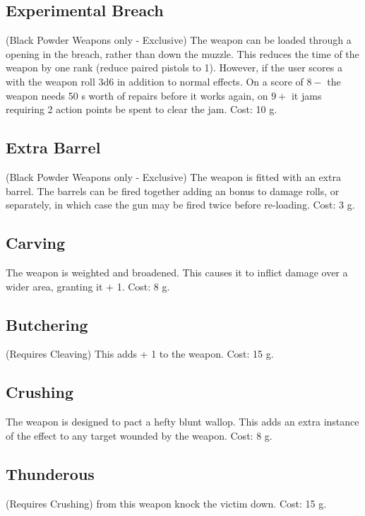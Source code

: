 \subsection{Experimental Breach}
(Black Powder Weapons only - Exclusive) The weapon can be loaded through a opening in the breach, rather than down the muzzle. This reduces the  time of the weapon by one rank (reduce paired pistols to  1). However, if the user scores a  with the weapon roll 3d6 in addition to normal  effects. On a score of $8-$ the weapon needs 50 s worth of repairs before it works again, on $9+$ it jams requiring 2 action points be spent to clear the jam. Cost: 10 g.

\subsection{Extra Barrel}
(Black Powder Weapons only - Exclusive) The weapon is fitted with an extra barrel. The barrels can be fired together adding an  bonus to damage rolls, or separately, in which case the gun may be fired twice before re-loading. Cost: 3 g.

\subsection{Carving}
The weapon is weighted and broadened. This causes it to inflict damage over a wider area, granting it  + 1. Cost: 8 g. 

\subsection{Butchering}
(Requires Cleaving) This adds  + 1 to the weapon. Cost: 15 g.

\subsection{Crushing}
The weapon is designed to pact a hefty blunt wallop. This adds an extra instance of the  effect to any target wounded by the weapon. Cost: 8 g.

\subsection{Thunderous}
(Requires Crushing)  from this weapon knock the victim down. Cost: 15 g.

